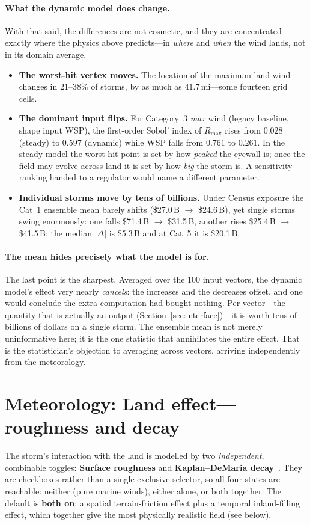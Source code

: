 \documentclass[11pt]{article}
\begin{document}
\paragraph{What the dynamic model does change.} With that said, the differences are not
cosmetic, and they are concentrated exactly where the physics above predicts---in
\emph{where} and \emph{when} the wind lands, not in its domain average.
\begin{itemize}
\item \textbf{The worst-hit vertex moves.} The location of the maximum land wind changes
in $21$--$38\%$ of storms, by as much as $41.7$\,mi---some fourteen grid cells.
\item \textbf{The dominant input flips.} For Category~3 \emph{max} wind (legacy
baseline, shape input WSP), the first-order Sobol' index of $R_{\max}$ rises from
$0.028$ (steady) to $0.597$ (dynamic) while WSP falls from $0.761$ to $0.261$. In the
steady model the worst-hit point is set by how
\emph{peaked} the eyewall is; once the field may evolve across land it is set by how
\emph{big} the storm is. A sensitivity ranking handed to a regulator would name a
different parameter.
\item \textbf{Individual storms move by tens of billions.} Under Census exposure the
Cat~1 ensemble mean barely shifts (\$27.0\,B $\to$ \$24.6\,B), yet single storms swing
enormously: one falls \$71.4\,B $\to$ \$31.5\,B, another rises \$25.4\,B $\to$
\$41.5\,B; the median $|\Delta|$ is \$5.3\,B and at Cat~5 it is \$20.1\,B.
\end{itemize}

\paragraph{The mean hides precisely what the model is for.} The last point is the
sharpest. Averaged over the 100 input vectors, the dynamic model's effect very nearly
\emph{cancels}: the increases and the decreases offset, and one would conclude the
extra computation had bought nothing. Per vector---the quantity that is actually an
output (Section~\ref{sec:interface})---it is worth tens of billions of dollars on a
single storm. The ensemble mean is not merely uninformative here; it is the one
statistic that annihilates the entire effect. That is the statistician's objection to
averaging across vectors, arriving independently from the meteorology.

\section{Meteorology: Land effect---roughness and decay}\label{sec:landeffect}
The storm's interaction with the land is modelled by two \emph{independent},
combinable toggles: \textbf{Surface roughness} and \textbf{Kaplan--DeMaria
decay}~\cite{kaplan}. They are checkboxes rather than a single exclusive selector, so all four
states are reachable: neither (pure marine winds), either alone, or both
together. The default is \textbf{both on}: a spatial terrain-friction effect plus
a temporal inland-filling effect, which together give the most physically
realistic field (see below).
\end{document}
